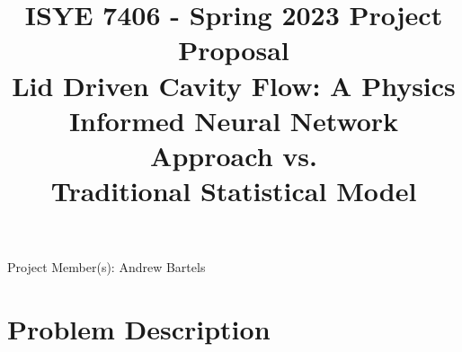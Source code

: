 \documentclass{article}
\begin{document}
%		
%		
%			
	

	\title{ISYE 7406 - Spring 2023 Project Proposal \\
	 Lid Driven Cavity Flow: 
				A Physics Informed Neural Network Approach vs. \\
				 Traditional Statistical Model}
	
	\maketitle
	
	Project Member(s): Andrew Bartels
	
	\section{Problem Description}
	
\end{document}
